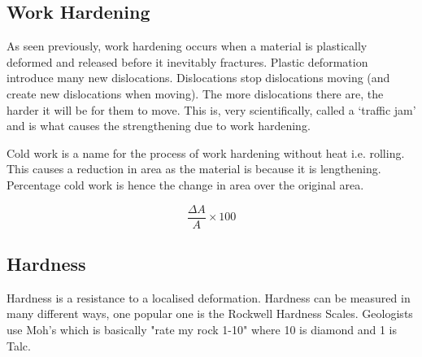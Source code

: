 \documentclass[12pt]{article}
\begin{document}
\subsection{Work Hardening} 
As seen previously, work hardening occurs when a material is plastically deformed and released before it inevitably fractures.
Plastic deformation introduce many new dislocations.
Dislocations stop dislocations moving (and create new dislocations when moving).
The more dislocations there are, the harder it will be for them to move. 
This is, very scientifically, called a `traffic jam' and is what causes the strengthening due to work hardening.

\vspace{1cm}
Cold work is a name for the process of work hardening without heat i.e. rolling.
This causes a reduction in area as the material is because it is lengthening. 
Percentage cold work is hence the change in area over the original area. 

\begin{equation*}
  \frac{\Delta A}{A} \times 100
\end{equation*}

\subsection{Hardness}
Hardness is a resistance to a localised deformation. 
Hardness can be measured in many different ways, one popular one is the Rockwell Hardness Scales.
Geologists use Moh's which is basically "rate my rock 1-10" where 10 is diamond and 1 is Talc.
\end{document}
